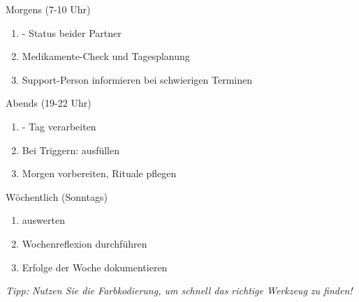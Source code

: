 \begin{ctmmGreenBox}{Morgens (7-10 Uhr)}
\begin{enumerate}
    \item {} - Status beider Partner
    \item Medikamente-Check und Tagesplanung
    \item Support-Person informieren bei schwierigen Terminen
\end{enumerate}
\end{ctmmGreenBox}

\begin{ctmmYellowBox}{Abends (19-22 Uhr)}
\begin{enumerate}
    \item {} - Tag verarbeiten
    \item Bei Triggern:  ausfüllen
    \item Morgen vorbereiten, Rituale pflegen
\end{enumerate}
\end{ctmmYellowBox}

\begin{ctmmRedBox}{Wöchentlich (Sonntags)}
\begin{enumerate}
    \item {} auswerten
    \item Wochenreflexion durchführen %
    \item Erfolge der Woche dokumentieren
\end{enumerate}
\end{ctmmRedBox}

\vspace{0.5cm}

\textit{Tipp: Nutzen Sie die Farbkodierung, um schnell das richtige Werkzeug zu finden!}
